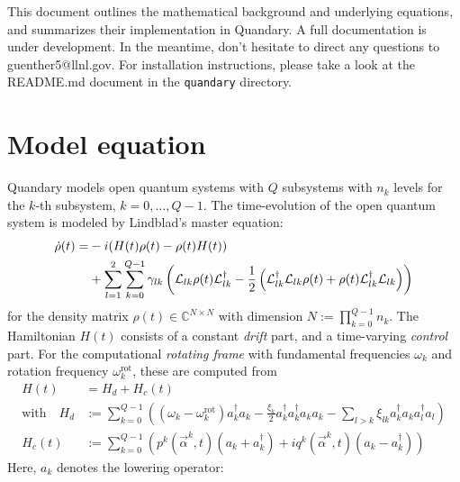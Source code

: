 \documentclass[11pt]{article}
\newcommand{\Ell}{\mathcal{L}}
\newcommand{\C}{\mathds{C}}
\begin{document}
This document outlines the mathematical background and underlying equations, and summarizes their
implementation in Quandary. A full documentation is under development. In the meantime, don't
hesitate to direct any questions to guenther5@llnl.gov. For installation instructions, please take a
look at the README.md document in the \verb+quandary+ directory.

\section{Model equation}
Quandary models open quantum systems with $Q$ subsystems with $n_k$ levels for the
$k$-th subsystem, $k=0,\dots,Q-1$. The time-evolution of the open quantum system is modeled by Lindblad's master equation:
\begin{align}\label{mastereq}
  \dot \rho(t) = &-i(H(t)\rho(t) - \rho(t)H(t)) \notag \\
  &+ \sum_{l=1}^2 \sum_{k=0}^{Q-1} \gamma_{lk} \left( \Ell_{lk} \rho(t)
  \Ell_{lk}^{\dagger} - \frac 1 2 \left( \Ell_{lk}^{\dagger}\Ell_{lk}
  \rho(t) + \rho(t)\Ell_{lk}^{\dagger} \Ell_{lk}\right) \right)
\end{align}
for the density matrix $\rho(t)\in \C^{N\times N}$ with dimension $N :=
\prod_{k=0}^{Q-1} n_k$. The Hamiltonian $H(t)$ consists of a constant \textit{drift}
part, and a time-varying \textit{control} part. For the computational
\textit{rotating frame} with fundamental frequencies $\omega_k$ and rotation
frequency $\omega_k^{\text{rot}}$, these are computed from
\begin{align}
  H(t) &= H_d + H_c(t) \\
  \text{with} \quad H_d &:= \sum_{k=0}^{Q-1} \left(\left(\omega_k -                                 
  \omega_k^{\text{rot}}\right)a_k^{\dagger}a_k- \frac{\xi_k}{2}
  a_k^{\dagger}a_k^{\dagger}a_k a_k - \sum_{l> k} \xi_{lk}
  a_{k}^{\dagger}a_{k}
  a_{l}^{\dagger} a_{l} \right) \\
   H_c(t) &:= \sum_{k=0}^{Q-1} \left( p^k(\vec{\alpha}^k,t) (a_k +
   a_k^{\dagger}) + i q^k(\vec{\alpha}^k,t)(a_k - a_k^{\dagger})
   \right)
\end{align}
Here, $a_k$ denotes the lowering operator:
\end{document}
